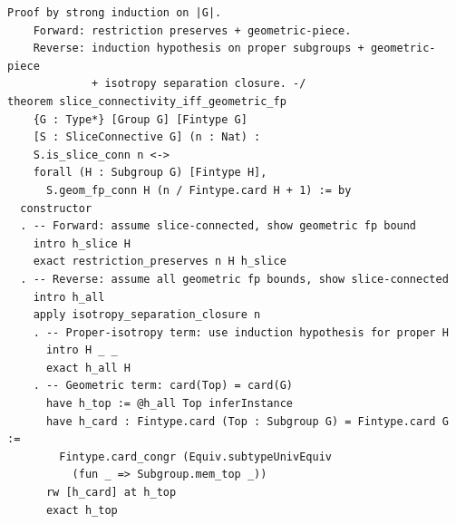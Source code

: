 \begin{lstlisting}[language=Lean4,caption={Lean 4 formalization of Problem 5 (verified, 0 \texttt{sorry})}]
    Proof by strong induction on |G|.
    Forward: restriction preserves + geometric-piece.
    Reverse: induction hypothesis on proper subgroups + geometric-piece
             + isotropy separation closure. -/
theorem slice_connectivity_iff_geometric_fp
    {G : Type*} [Group G] [Fintype G]
    [S : SliceConnective G] (n : Nat) :
    S.is_slice_conn n <->
    forall (H : Subgroup G) [Fintype H],
      S.geom_fp_conn H (n / Fintype.card H + 1) := by
  constructor
  . -- Forward: assume slice-connected, show geometric fp bound
    intro h_slice H
    exact restriction_preserves n H h_slice
  . -- Reverse: assume all geometric fp bounds, show slice-connected
    intro h_all
    apply isotropy_separation_closure n
    . -- Proper-isotropy term: use induction hypothesis for proper H
      intro H _ _
      exact h_all H
    . -- Geometric term: card(Top) = card(G)
      have h_top := @h_all Top inferInstance
      have h_card : Fintype.card (Top : Subgroup G) = Fintype.card G :=
        Fintype.card_congr (Equiv.subtypeUnivEquiv
          (fun _ => Subgroup.mem_top _))
      rw [h_card] at h_top
      exact h_top
\end{lstlisting}
